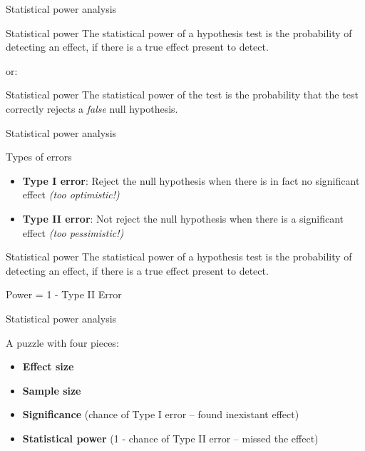 \documentclass[compress]{beamer}
\begin{document}
\begin{frame}{Statistical power analysis}

\begin{exampleblock}{Statistical power}
    The statistical power of a hypothesis test is the probability of detecting an effect, if there is a true effect present to detect.
\end{exampleblock}

or:

\begin{exampleblock}{Statistical power}
    The statistical power of the test is the probability that
    the test correctly rejects a \emph{false} null hypothesis.
\end{exampleblock}


\end{frame}

\begin{frame}{Statistical power analysis}


\begin{exampleblock}{Types of errors}
    \begin{itemize}
        \item \textbf{Type I error}: Reject the null hypothesis when there is in
            fact no significant effect \emph{(too optimistic!)}
        \item \textbf{Type II error}: Not reject the null hypothesis when there
            is a significant effect \emph{(too pessimistic!)}
    \end{itemize}
\end{exampleblock}

    \pause

    \begin{exampleblock}{Statistical power}
        The statistical power of a hypothesis test is the probability of detecting an effect, if there is a true effect present to detect.
    \end{exampleblock}

    \pause

    \Large
    \centering
    \bf

    Power = 1 - Type II Error

\end{frame}

\begin{frame}{Statistical power analysis}

A puzzle with four pieces:

    \begin{itemize}
        \item \textbf{Effect size}
        \item \textbf{Sample size}
        \item \textbf{Significance} (chance of Type I error -- found inexistant
            effect)
        \item \textbf{Statistical power} (1 - chance of Type II error -- missed the effect)

    \end{itemize}
\end{frame}
\end{document}
